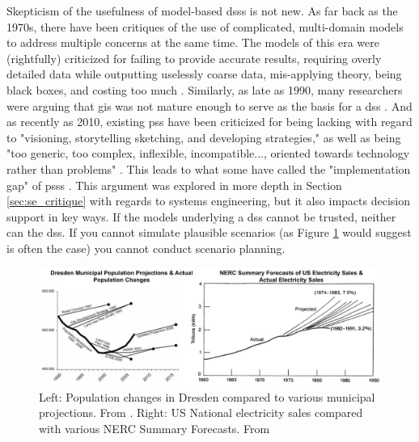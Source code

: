Skepticism of the usefulness of model-based \acp{dss} is not new. As far back as the 1970s, there have been critiques of the use of complicated, multi-domain models to address multiple concerns at the same time. The models of this era were (rightfully) criticized for failing to provide accurate results, requiring overly detailed data while outputting uselessly coarse data, mis-applying theory, being black boxes, and costing too much \cite{leejrRequiemLargeScaleModels1973}. Similarly, as late as 1990, many researchers were arguing that \ac{gis} was not mature enough to serve as the basis for a \ac{dss} \cite{jankowskiIntegratingGeographicalInformation1995}. And as recently as 2010, existing \ac{pss} have been criticized for being lacking with regard to "visioning, storytelling sketching, and developing strategies," as well as being "too generic, too complex, inflexible, incompatible..., oriented towards technology rather than problems" \cite{brommelstroetPlanningSupportSystems2010}. This leads to what some have called the "implementation gap" of \acp{pss} \cite{BottlenecksBlockingWidespread}. This argument was explored in more depth in Section \ref{sec:se_critique} with regards to systems engineering, but it also impacts decision support in key ways. If the models underlying a \ac{dss} cannot be trusted, neither can the \ac{dss}. If you cannot simulate plausible scenarios (as Figure \ref{fig:projections} would suggest is often the case) you cannot conduct scenario planning.  

\begin{figure}[!htb]
	\centering
	\includegraphics[scale=0.32]{Figures/chap2/projections.jpg}
	\caption[Projections compared to actual changes]{Left: Population changes in Dresden compared to various municipal projections. From \cite{wiechmannErrorsExpectedAligning2008}. Right: US National electricity sales compared with various NERC Summary Forecasts. From \cite{nelsonNERCFanRetrospective1985}}
	\label{fig:projections}
\end{figure}

